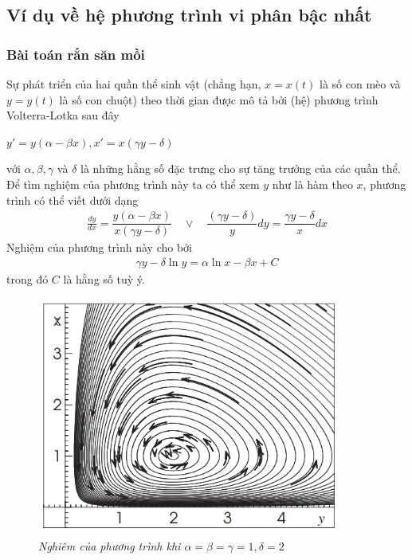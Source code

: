 \documentclass[13pt,a4paper]{article}
\begin{document}
		\subsection{Ví dụ về hệ phương trình vi phân bậc nhất}
			\subsubsection{Bài toán rắn săn mồi}
				Sự phát triển của hai quần thể sinh vật (chẳng hạn, $x = x(t)$ là số con mèo và $y = y(t)$ là số con chuột) theo thời gian được mô tả bởi (hệ) phương trình Volterra-Lotka sau đây
				\begin{center}
					$y' = y(\alpha - \beta x), x' =	x(\gamma y - \delta)$
				\end{center}
				với $\alpha, \beta, \gamma$ và $\delta$ là những hằng số đặc trưng cho sự tăng trưởng của các quần thể. \\
				Để tìm nghiệm của phương trình này ta có thể xem $y$ như là hàm theo $x$, phương trình có thể viết dưới dạng
				\begin{align*}
					\frac{dy}{dx} = \dfrac{y(\alpha - \beta x)}{x(\gamma y - \delta)}\quad \vee \quad \dfrac{(\gamma y - \delta)}{y}dy = \dfrac{\gamma y - \delta}{x}dx
				\end{align*}
				Nghiệm của phương trình này cho bởi
				\begin{align*}
					\gamma y - \delta \ln y = \alpha \ln x - \beta x + C
				\end{align*}
				trong đó $C$ là hằng số tuỳ ý.
				\begin{figure}[h!]
					\begin{center}
						\includegraphics[width=10cm]{snake.png}
						\caption{\textit{Nghiêm của phương trình khi $\alpha = \beta = \gamma = 1, \delta = 2$}}
					\end{center}
				\end{figure}
\end{document}
